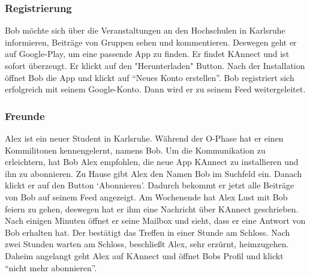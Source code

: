 \documentclass[parskip=full]{scrartcl}
\begin{document}
		\subsubsection{Registrierung}
		Bob möchte sich über die Veranstaltungen an den Hochschulen in Karlsruhe informieren, Beiträge von Gruppen sehen und kommentieren. Deswegen geht er auf Google-Play, um eine passende App zu finden. Er findet KAnnect und ist sofort überzeugt. Er klickt auf den "Herunterladen" Button. Nach der Installation öffnet Bob die App und klickt auf “Neues Konto erstellen”. Bob registriert sich erfolgreich mit seinem Google-Konto. Dann wird er zu seinem \gls{Feed} weitergeleitet.
		
		\subsubsection{Freunde}
		Alex ist ein neuer Student in Karlsruhe.  Während der O-Phase hat er einen Kommilitonen kennengelernt, namens Bob. Um die Kommunikation zu erleichtern, hat Bob Alex empfohlen, die neue App  KAnnect zu installieren und ihn zu abonnieren. Zu Hause gibt Alex den Namen Bob im Suchfeld ein. Danach klickt er auf den Button ‘Abonnieren’. Dadurch bekommt er jetzt alle Beiträge von Bob auf seinem \gls{Feed} angezeigt. Am Wochenende hat Alex Lust mit Bob feiern zu gehen, deswegen hat er ihm eine Nachricht über KAnnect geschrieben. Nach einigen Minuten öffnet er seine Mailbox und sieht, dass er eine Antwort von Bob erhalten hat. Der bestätigt das Treffen in einer Stunde am Schloss. Nach zwei Stunden warten am Schloss, beschließt Alex, sehr erzürnt, heimzugehen. Daheim angelangt geht Alex auf KAnnect und öffnet Bobs Profil und klickt “nicht mehr abonnieren”.
		
\end{document}
